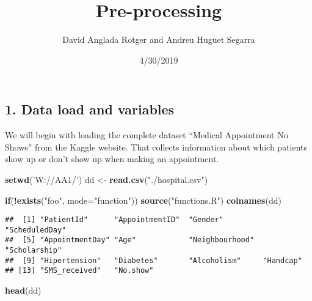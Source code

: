 \documentclass[]{article}
\title{Pre-processing}
\author{David Anglada Rotger and Andreu Huguet Segarra}
\date{4/30/2019}
\newenvironment{Shaded}{\begin{snugshade}}{\end{snugshade}}
\newcommand{\KeywordTok}[1]{\textcolor[rgb]{0.13,0.29,0.53}{\textbf{#1}}}
\newcommand{\DataTypeTok}[1]{\textcolor[rgb]{0.13,0.29,0.53}{#1}}
\newcommand{\StringTok}[1]{\textcolor[rgb]{0.31,0.60,0.02}{#1}}
\newcommand{\ControlFlowTok}[1]{\textcolor[rgb]{0.13,0.29,0.53}{\textbf{#1}}}
\newcommand{\OperatorTok}[1]{\textcolor[rgb]{0.81,0.36,0.00}{\textbf{#1}}}
\newcommand{\NormalTok}[1]{#1}
\begin{document}
\maketitle

\subsection{1. Data load and variables}\label{data-load-and-variables}

We will begin with loading the complete dataset ``Medical Appointment No
Shows'' from the Kaggle website. That collects information about which
patients show up or don't show up when making an appointment.

\begin{Shaded}
\begin{Highlighting}[]
\KeywordTok{setwd}\NormalTok{(}\StringTok{'W://AA1/'}\NormalTok{)}
\NormalTok{dd <-}\StringTok{ }\KeywordTok{read.csv}\NormalTok{(}\StringTok{"./hospital.csv"}\NormalTok{)}
\end{Highlighting}
\end{Shaded}

\begin{Shaded}
\begin{Highlighting}[]
\ControlFlowTok{if}\NormalTok{(}\OperatorTok{!}\KeywordTok{exists}\NormalTok{(}\StringTok{"foo"}\NormalTok{, }\DataTypeTok{mode=}\StringTok{"function"}\NormalTok{)) }\KeywordTok{source}\NormalTok{(}\StringTok{"functions.R"}\NormalTok{)}
\KeywordTok{colnames}\NormalTok{(dd)}
\end{Highlighting}
\end{Shaded}

\begin{verbatim}
##  [1] "PatientId"      "AppointmentID"  "Gender"         "ScheduledDay"  
##  [5] "AppointmentDay" "Age"            "Neighbourhood"  "Scholarship"   
##  [9] "Hipertension"   "Diabetes"       "Alcoholism"     "Handcap"       
## [13] "SMS_received"   "No.show"
\end{verbatim}

\begin{Shaded}
\begin{Highlighting}[]
\KeywordTok{head}\NormalTok{(dd)}
\end{Highlighting}
\end{Shaded}
\end{document}
